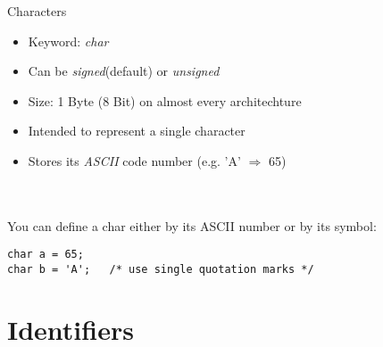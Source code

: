 \begin{frame}[fragile]{Characters}
	\begin{itemize}
		\item Keyword: \textit{char}
		\item Can be \textit{signed}(default) or \textit{unsigned}	
		\item Size: 1 Byte (8 Bit) on almost every architechture
		\item Intended to represent a single character
		\item Stores its \textit{ASCII} code number (e.g. 'A' $\Rightarrow$ 65)
	\end{itemize}\ \\
	\ \\
	You can define a char either by its ASCII number or by its symbol:
	\begin{lstlisting}[numbers=none]
char a = 65;
char b = 'A';	/* use single quotation marks */
\end{lstlisting}
\end{frame}
\section{Identifiers}
